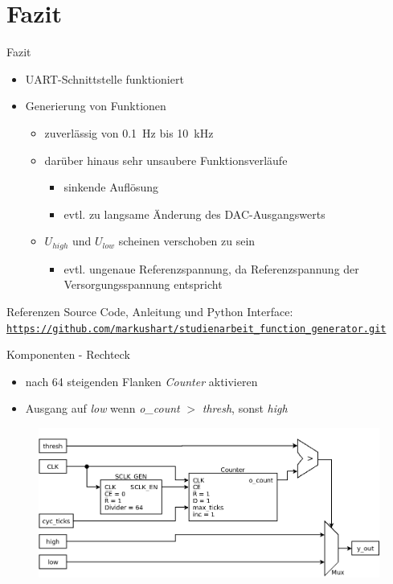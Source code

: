\documentclass[11pt]{beamer}
\begin{document}
\section{Fazit}
\begin{frame}{Fazit}
  \begin{itemize}
  \item UART-Schnittstelle funktioniert
  \item Generierung von Funktionen
    \begin{itemize}
      \item zuverlässig von \SI{0.1}{\hertz} bis \SI{10}{\kilo\hertz}
      \item darüber hinaus sehr unsaubere Funktionsverläufe
        \begin{itemize}
        \item sinkende Auflösung
        \item evtl. zu langsame Änderung des DAC-Ausgangswerts
        \end{itemize}
      \item $U_{high}$ und $U_{low}$ scheinen verschoben zu sein
      \begin{itemize}
        \item evtl. ungenaue Referenzspannung, da Referenzspannung der Versorgungsspannung entspricht
      \end{itemize}
      \end{itemize}
  \end{itemize}
\end{frame}

\begin{frame}{Referenzen}
  Source Code, Anleitung und Python Interface:\\ 
  \href{https://github.com/markushart/studienarbeit_function_generator.git}{\small\texttt{https://github.com/markushart/studienarbeit\_function\_generator.git}}
\end{frame}

\begin{frame}{Komponenten - Rechteck}
  \begin{itemize}
  \item nach 64 steigenden Flanken \emph{Counter} aktivieren
  \item Ausgang auf \emph{low} wenn \emph{o\_count} $>$ \emph{thresh}, sonst \emph{high} 
  \end{itemize}
  \begin{figure}
    \includegraphics[scale=0.32]{square}
  \end{figure}
\end{frame}
\end{document}
